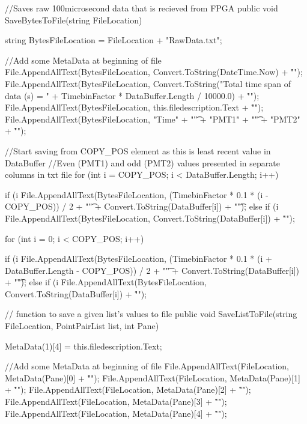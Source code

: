 {{        //Saves raw 100microsecond data that is recieved from FPGA
        public void SaveBytesToFile(string FileLocation)
        {

            string BytesFileLocation = FileLocation + "RawData.txt";
            
            //Add some MetaData at beginning of file
            File.AppendAllText(BytesFileLocation, Convert.ToString(DateTime.Now) + "\r\n");
            File.AppendAllText(BytesFileLocation, Convert.ToString("Total time span of data (s) = " + TimebinFactor * DataBuffer.Length / 10000.0) + "\r\n");
            File.AppendAllText(BytesFileLocation, this.filedescription.Text + "\r\n");
            File.AppendAllText(BytesFileLocation, "Time" + "\t" + "PMT1" + "\t" + "PMT2" + "\r\n");
            
            //Start saving from COPY_POS element as this is least recent value in DataBuffer
            //Even (PMT1) and odd (PMT2) values presented in separate columns in txt file
            for (int i = COPY_POS; i < DataBuffer.Length; i++)
            {
                if (i %
                {
                    File.AppendAllText(BytesFileLocation, (TimebinFactor * 0.1 * (i - COPY_POS)) / 2 + "\t" + Convert.ToString(DataBuffer[i]) + "\t");
                }
                else if (i %
                {
                    File.AppendAllText(BytesFileLocation, Convert.ToString(DataBuffer[i]) + "\r\n");
                }

            }
            for (int i = 0; i < COPY_POS; i++)
            {
                if (i %
                {
                    File.AppendAllText(BytesFileLocation, (TimebinFactor * 0.1 * (i + DataBuffer.Length - COPY_POS)) / 2 + "\t" + Convert.ToString(DataBuffer[i]) + "\t");
                }
                else if (i %
                {
                    File.AppendAllText(BytesFileLocation, Convert.ToString(DataBuffer[i]) + "\r\n");
                }

            }
        }

        // function to save a given list's values to file
        public void SaveListToFile(string FileLocation, PointPairList list, int Pane)
        {

            MetaData(1)[4] = this.filedescription.Text;

            //Add some MetaData at beginning of file
            File.AppendAllText(FileLocation, MetaData(Pane)[0] + "\r\n");
            File.AppendAllText(FileLocation, MetaData(Pane)[1] + "\r\n");
            File.AppendAllText(FileLocation, MetaData(Pane)[2] + "\r\n");
            File.AppendAllText(FileLocation, MetaData(Pane)[3] + "\r\n");
            File.AppendAllText(FileLocation, MetaData(Pane)[4] + "\r\n");

}}}
